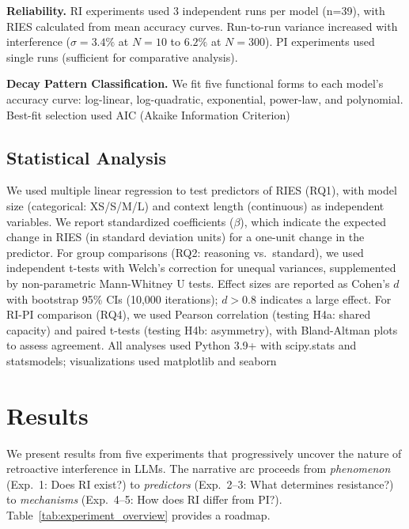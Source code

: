 \documentclass{article}
\begin{document}
\textbf{Reliability.} RI experiments used 3 independent runs per model (n=39), with RIES calculated from mean accuracy curves. Run-to-run variance increased with interference ($\sigma = 3.4\%$ at $N=10$ to $6.2\%$ at $N=300$). PI experiments used single runs (sufficient for comparative analysis).

\textbf{Decay Pattern Classification.} We fit five functional forms to each model's accuracy curve: log-linear, log-quadratic, exponential, power-law, and polynomial. Best-fit selection used AIC (Akaike Information Criterion)

\subsection{Statistical Analysis}

We used multiple linear regression to test predictors of RIES (RQ1), with model size (categorical: XS/S/M/L) and context length (continuous) as independent variables. We report standardized coefficients ($\beta$), which indicate the expected change in RIES (in standard deviation units) for a one-unit change in the predictor. For group comparisons (RQ2: reasoning vs.\ standard), we used independent t-tests with Welch's correction for unequal variances, supplemented by non-parametric Mann-Whitney U tests. Effect sizes are reported as Cohen's $d$ with bootstrap 95\% CIs (10,000 iterations); $d > 0.8$ indicates a large effect. For RI-PI comparison (RQ4), we used Pearson correlation (testing H4a: shared capacity) and paired t-tests (testing H4b: asymmetry), with Bland-Altman plots to assess agreement. All analyses used Python 3.9+ with scipy.stats and statsmodels; visualizations used matplotlib and seaborn

\section{Results}

We present results from five experiments that progressively uncover the nature of retroactive interference in LLMs. The narrative arc proceeds from \textit{phenomenon} (Exp.~1: Does RI exist?) to \textit{predictors} (Exp.~2--3: What determines resistance?) to \textit{mechanisms} (Exp.~4--5: How does RI differ from PI?). Table~\ref{tab:experiment_overview} provides a roadmap.
\end{document}
